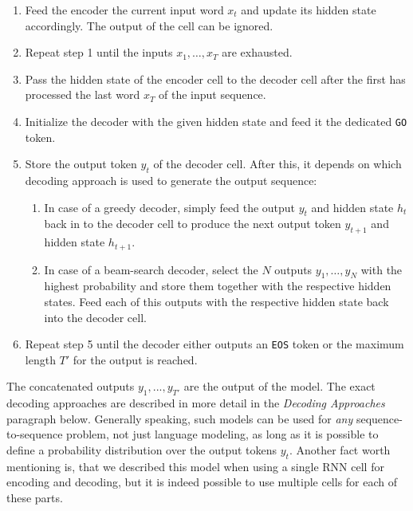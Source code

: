 \begin{enumerate}[noitemsep]
	\item Feed the encoder the current input word $x_t$ and update its hidden state accordingly. The output of the cell can be ignored.
	\item Repeat step 1 until the inputs $x_1,\dots,x_{T}$ are exhausted.
	\item Pass the hidden state of the encoder cell to the decoder cell after the first has processed the last word $x_T$ of the input sequence.
	\item Initialize the decoder with the given hidden state and feed it the dedicated \texttt{GO} token.
	\item Store the output token $y_t$ of the decoder cell. After this, it depends on which decoding approach is used to generate the output sequence:
	\begin{enumerate}
		\item In case of a greedy decoder, simply feed the output $y_t$ and hidden state $h_t$ back in to the decoder cell to produce the next output token $y_{t+1}$ and hidden state $h_{t+1}$.
		\item In case of a beam-search decoder, select the $N$ outputs $y_1,\dots,y_{N}$ with the highest probability and store them together with the respective hidden states. Feed each of this outputs with the respective hidden state back into the decoder cell.
	\end{enumerate}
	\item Repeat step 5 until the decoder either outputs an \texttt{EOS} token or the maximum length $T'$ for the output is reached.
\end{enumerate}

The concatenated outputs $y_1,...,y_{T'}$ are the output of the model. The exact decoding approaches are described in more detail in the \emph{Decoding Approaches} paragraph below. Generally speaking, such models can be used for \emph{any} sequence-to-sequence problem, not just language modeling, as long as it is possible to define a probability distribution over the output tokens $y_t$. Another fact worth mentioning is, that we described this model when using a single RNN cell for encoding and decoding, but it is indeed possible to use multiple cells for each of these parts.

